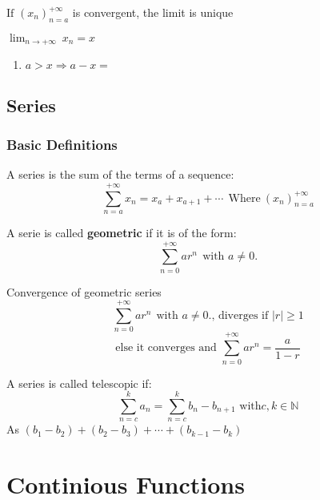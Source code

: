 \documentclass[12pt, a4paper]{book}
\begin{document}
\begin{prop}
  $\text{If } (x_n)^{+\infty}_{n=a}$ is convergent, the limit is unique
\end{prop}

\begin{exmp} $\lim_{n \rightarrow +\infty} \ x_n=x$
  \begin{enumerate}[label=\alph*]
    \item $a>x \Rightarrow a-x=$
  \end{enumerate}
  
\end{exmp}

\section{Series}
\subsection{Basic Definitions}
\begin{defn}
  A series is the sum of the terms of a sequence:
  \[
    \sum_{n=a}^{+\infty} x_n = x_a + x_{a+1} + \cdots 
    \ \ \text{Where} \ (x_n)_{n=a}^{+\infty}
  \]
\end{defn}

\begin{defn}
  A serie is called \textbf{geometric} if it is of the form:
  \[
    \sum_{n=0}^{+\infty} a r^n \ \ \text{with } a \neq 0. 
  \]
  
\end{defn}

\begin{prop}
  Convergence of geometric series
  \[
    \sum_{n=0}^{+\infty} a r^n \ \ \text{with } a \neq 0.
  \text{, diverges if } |r| \geq 1
  \] 
  \[
    \text{else it converges and }
    \sum_{n=0}^{+\infty} a r^n = \dfrac{a}{1-r}
  \]  
\end{prop}

\begin{defn}
  A series is called telescopic if:
  \[
    \sum_{n=c}^k a_n = \sum_{n=c}^k b_n - b_{n+1} \text{ with} c,k \in \mathbb{N}
  \]
  As $ (b_1 - b_2) + (b_2 - b_3) + \cdots + (b_{k - 1} - b_k)$
\end{defn}

\chapter{Continious Functions}
\end{document}
